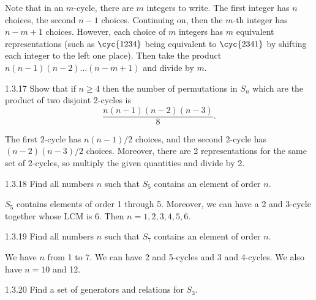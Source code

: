 \begin{sol}[spsol]
    Note that in an $m$-cycle, there are $m$ integers to write.
	The first integer has $n$ choices, the second $n - 1$ choices.
	Continuing on, then the $m$-th integer has $n - m + 1$ choices.
	However, each choice of $m$ integers has $m$ equivalent representations (such as $\cyc{1 2 3 4}$ being equivalent to $\cyc{2 3 4 1}$ by shifting each integer to the left one place).
	Then take the product $n(n - 1)(n - 2) \ldots (n - m + 1)$ and divide by $m$.
\end{sol}

\begin{exercise}{1.3.17}
    Show that if $n \geq 4$ then the number of permutations in $S_n$ which are the product of two disjoint 2-cycles is
    \[
    	\frac{n(n - 1)(n - 2)(n - 3)}{8}.
    \]
\end{exercise}

\begin{sol}
    The first 2-cycle has $n(n - 1)/2$ choices, and the second 2-cycle has $(n - 2)(n - 3)/2$ choices.
	Moreover, there are 2 representations for the same set of 2-cycles, so multiply the given quantities and divide by 2.
\end{sol}

\begin{exercise}{1.3.18}
    Find all numbers $n$ such that $S_5$ contains an element of order $n$.
\end{exercise}

\begin{sol}
    $S_5$ contains elements of order 1 through 5.
	Moreover, we can have a 2 and 3-cycle together whose LCM is 6.
	Then $n = 1, 2, 3, 4, 5, 6$.
\end{sol}

\begin{exercise}{1.3.19}
    Find all numbers $n$ such that $S_7$ contains an element of order $n$.
\end{exercise}

\begin{sol}
    We have $n$ from 1 to 7.
	We can have 2 and 5-cycles and 3 and 4-cycles.
	We also have $n = 10$ and 12.
\end{sol}

\begin{exercise}{1.3.20}
    Find a set of generators and relations for $S_3$.
\end{exercise}

